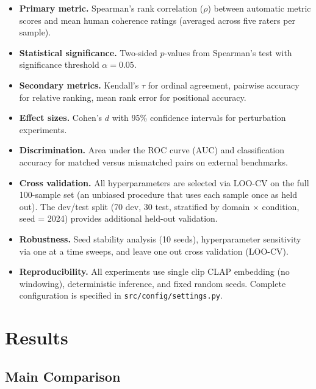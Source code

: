 \documentclass[a4paper,fleqn]{cas-sc}
\begin{document}
\begin{itemize}
\begin{itemize}
\item \textbf{Primary metric.}
Spearman's rank correlation ($\rho$) between automatic metric scores and mean human coherence ratings (averaged across five raters per sample).

\item \textbf{Statistical significance.}
Two-sided $p$-values from Spearman's test with significance threshold $\alpha = 0.05$.

\item \textbf{Secondary metrics.}
Kendall's $\tau$ for ordinal agreement, pairwise accuracy for relative ranking, mean rank error for positional accuracy.

\item \textbf{Effect sizes.}
Cohen's $d$ with 95\% confidence intervals for perturbation experiments.

\item \textbf{Discrimination.}
Area under the ROC curve (AUC) and classification accuracy for matched versus mismatched pairs on external benchmarks.

\item \textbf{Cross validation.}
All hyperparameters are selected via LOO-CV on the full 100-sample set (an unbiased procedure that uses each sample once as held out). The dev/test split (70 dev, 30 test, stratified by domain $\times$ condition, seed = 2024) provides additional held-out validation.

\item \textbf{Robustness.}
Seed stability analysis (10 seeds), hyperparameter sensitivity via one at a time sweeps, and leave one out cross validation (LOO-CV).

\item \textbf{Reproducibility.}
All experiments use single clip CLAP embedding (no windowing), deterministic inference, and fixed random seeds. Complete configuration is specified in \texttt{src/config/settings.py}.

\end{itemize}

\section{Results}\label{sec:results}

\subsection{Main Comparison}\label{sec:main-comparison}


\end{itemize}
\end{document}
